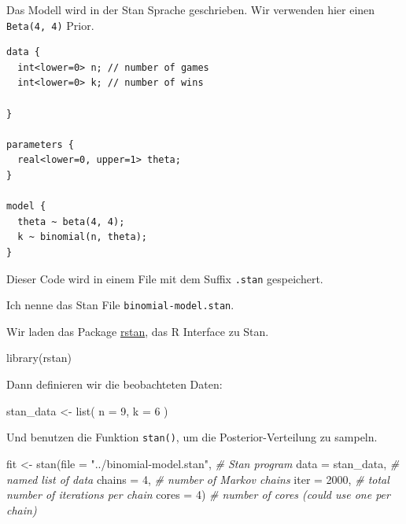 \documentclass[]{tufte-handout}
\newenvironment{Shaded}{}{}
\newcommand{\AttributeTok}[1]{\textcolor[rgb]{0.49,0.56,0.16}{#1}}
\newcommand{\CommentTok}[1]{\textcolor[rgb]{0.38,0.63,0.69}{\textit{#1}}}
\newcommand{\DecValTok}[1]{\textcolor[rgb]{0.25,0.63,0.44}{#1}}
\newcommand{\FunctionTok}[1]{\textcolor[rgb]{0.02,0.16,0.49}{#1}}
\newcommand{\NormalTok}[1]{#1}
\newcommand{\OtherTok}[1]{\textcolor[rgb]{0.00,0.44,0.13}{#1}}
\newcommand{\StringTok}[1]{\textcolor[rgb]{0.25,0.44,0.63}{#1}}
\begin{document}
Das Modell wird in der Stan Sprache geschrieben. Wir verwenden hier
einen \texttt{Beta(4,\ 4)} Prior.

\begin{verbatim}
data {
  int<lower=0> n; // number of games
  int<lower=0> k; // number of wins
  
}

parameters {
  real<lower=0, upper=1> theta;
}

model {
  theta ~ beta(4, 4);
  k ~ binomial(n, theta);
}
\end{verbatim}

Dieser Code wird in einem File mit dem Suffix \texttt{.stan}
gespeichert.

Ich nenne das Stan File \texttt{binomial-model.stan}.

Wir laden das Package \href{https://mc-stan.org/rstan/}{rstan}, das R
Interface zu Stan.

\begin{Shaded}
\begin{Highlighting}[]
\FunctionTok{library}\NormalTok{(rstan)}
\end{Highlighting}
\end{Shaded}

Dann definieren wir die beobachteten Daten:

\begin{Shaded}
\begin{Highlighting}[]
\NormalTok{stan\_data }\OtherTok{\textless{}{-}} \FunctionTok{list}\NormalTok{(}
  \AttributeTok{n =} \DecValTok{9}\NormalTok{,}
  \AttributeTok{k =} \DecValTok{6}
\NormalTok{)}
\end{Highlighting}
\end{Shaded}

Und benutzen die Funktion \texttt{stan()}, um die Posterior-Verteilung
zu sampeln.

\begin{Shaded}
\begin{Highlighting}[]
\NormalTok{fit }\OtherTok{\textless{}{-}} \FunctionTok{stan}\NormalTok{(}\AttributeTok{file =} \StringTok{"../binomial{-}model.stan"}\NormalTok{,  }\CommentTok{\# Stan program}
            \AttributeTok{data =}\NormalTok{ stan\_data,    }\CommentTok{\# named list of data}
            \AttributeTok{chains =} \DecValTok{4}\NormalTok{,          }\CommentTok{\# number of Markov chains}
            \AttributeTok{iter =} \DecValTok{2000}\NormalTok{,         }\CommentTok{\# total number of iterations per chain}
            \AttributeTok{cores =} \DecValTok{4}\NormalTok{)           }\CommentTok{\# number of cores (could use one per chain)}
\end{Highlighting}
\end{Shaded}
\end{document}
